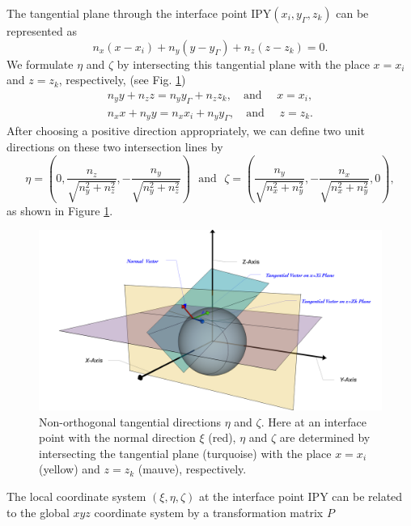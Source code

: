 \documentclass[dissertation]{uathesis}
\begin{document}
\begin{body}
The tangential plane through the interface point IPY$(x_{i},y_{\Gamma},z_{k})$ can be represented as  
%
\begin{equation} \label{tangential_plane}
n_{x}(x-x_{i}) + n_{y}(y-y_{\Gamma}) + n_{z}(z-z_{k}) = 0.
\end{equation}
%
We formulate $\eta$ and $\zeta$ by intersecting this tangential plane with the place $x=x_i$ and $z=z_k$, respectively, (see Fig. \ref{fig:local_coordinate})
%
\begin{align}\label{Intersecting lines}
n_{y}y + n_{z}z = n_{y}y_{\Gamma} + n_{z}z_{k}, \quad \mbox{and } \quad x = x_i, \\
n_{x}x + n_{y}y = n_{x}x_{i} + n_{y}y_{\Gamma}, \quad \mbox{and } \quad z = z_k.
\end{align}
%
After choosing a positive direction appropriately, we can define two unit directions on these two intersection lines by 
%
$$\eta = (0, \frac{n_{z}}{\sqrt{n^{2}_{y}+n^{2}_{z}}}, -\frac{n_{y}}{\sqrt{n^{2}_{y}+n^{2}_{z}}}) ~~~ \mbox{and} ~~~ \zeta = ( \frac{n_{y}}{\sqrt{n^{2}_{x}+n^{2}_{y}}}, -\frac{n_{x}}{\sqrt{n^{2}_{x}+n^{2}_{y}}}, 0 ),$$
%
as shown in Figure \ref{fig:local_coordinate}.
%
\begin{figure}[!tb] 
	\begin{center}
		\includegraphics[width=17cm]{../figures/Local-Coordinate.png}
	\end{center}
	\caption{Non-orthogonal tangential directions $\eta$ and $\zeta$. Here at an interface point with
		the normal direction $\xi$ (red), $\eta$ and $\zeta$ are determined by intersecting the tangential plane (turquoise) with the place $x=x_i$ (yellow) and $z=z_k$ (mauve), respectively. 	
	}
	\label{fig:local_coordinate}
\end{figure}
%
The local coordinate system $(\xi,\eta,\zeta)$ at the interface point IPY
can be related to the global $xyz$ coordinate system by a transformation matrix $P$

\end{body}
\end{document}
